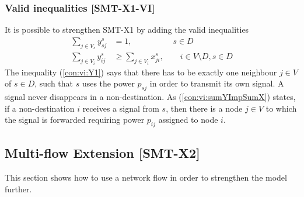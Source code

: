 \subsubsection{Valid inequalities [SMT-X1-VI]}

It is possible to strengthen SMT-X1 by adding the valid inequalities
  \begin{subequations}[resume]
  \begin{flalign}
 \label{con:vi:Y1}  \sum\limits_{j\in V_s}  y^{s}_{sj} & =1,  \quad\quad\quad\quad\quad s\in D \\
\label{con:vi:sumYImpSumX} \sum\limits_{j\in V_i }y^{s}_{ij} & \geq \sum\limits_{j\in V_i}  x^{s}_{ji},   \quad\quad   i\in V\setminus D, s\in D 
\end{flalign}
  \end{subequations}
The inequality (\ref{con:vi:Y1}) says that there has to be exactly one neighbour $j\in V$ of $s\in D$, such that $s$ uses the power $p_{sj}$ in order to transmit its own signal. A signal never disappears in a non-destination. As (\ref{con:vi:sumYImpSumX}) states, if a non-destination $i$ receives a signal from $s$, then there is a node $j\in V$ to which the signal is forwarded requiring power $p_{ij}$ assigned to node $i$.

\subsection{Multi-flow Extension [SMT-X2]}
This section shows how to use a network flow in order to strengthen the model further.
